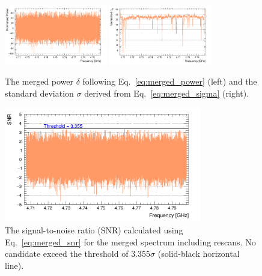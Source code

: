 \begin{figure}[h]
    \centering
    \includegraphics[width=0.4\textwidth,height = 0.3\textwidth]{figures/Power_GrandSpectrum_AxionRun_AllSteps_Rescan_Merged_5bin_SG4_W201_LqWeight.png}
    \includegraphics[width=0.4\textwidth,height = 0.3\textwidth]{figures/Sigma_GrandSpectrum_AxionRun_AllSteps_Rescan_Merged_5bin_SG4_W201_LqWeight.png}
    \caption{The merged power $\delta$ following Eq.~\eqref{eq:merged_power} 
(left) and the standard deviation $\sigma$ derived from Eq.~\eqref{eq:merged_sigma} (right).}
    \label{fig:power_sigma_merged}
\end{figure}

\begin{figure}[hbt!]
    \centering
    \includegraphics[width=8.6cm]{figures/SNR_GrandSpectrum_AxionRun_AllSteps_Rescan_Merged_5bin_SG4_W201_LqWeight.png}
    \caption{The signal-to-noise ratio (SNR) calculated using Eq.~\eqref{eq:merged_snr} for the merged spectrum including rescans. 
No candidate exceed the threshold of 
$3.355\sigma$ (solid-black horizontal line). }
    \label{fig:SNR_merged}
\end{figure}
